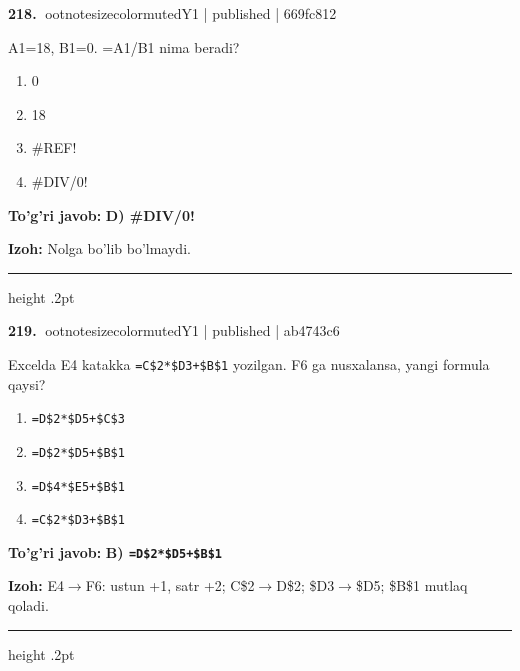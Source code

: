 \documentclass[10pt,a4paper]{article}
\begin{document}
\textbf{\color{ink}218.} {ootnotesizecolor{muted}Y1 | published | 669fc812}
\par
A1=18, B1=0. =A1/B1 nima beradi?
\begin{enumerate}[label=\Alph*),leftmargin=9mm]
\item 0
\item 18
\item \#REF!
\item \#DIV/0!
\end{enumerate}
\begin{tcolorbox}[enhanced,breakable,colback=teal!4,colframe=teal!55!black,boxrule=0.45pt,arc=1.2mm,left=2.8mm,right=2.8mm,top=2mm,bottom=2mm]
\textbf{\color{teal}To'g'ri javob:} \textbf{D) \#DIV/0!}
\par\smallskip
\textbf{Izoh:} Nolga bo'lib bo'lmaydi.
\end{tcolorbox}
\vspace{2mm}\hrule height .2pt\vspace{2mm}

\textbf{\color{ink}219.} {ootnotesizecolor{muted}Y1 | published | ab4743c6}
\par
Excelda E4 katakka \texttt{=C\$2*\$D3+\$B\$1} yozilgan. F6 ga nusxalansa, yangi formula qaysi?
\begin{enumerate}[label=\Alph*),leftmargin=9mm]
\item \texttt{=D\$2*\$D5+\$C\$3}
\item \texttt{=D\$2*\$D5+\$B\$1}
\item \texttt{=D\$4*\$E5+\$B\$1}
\item \texttt{=C\$2*\$D3+\$B\$1}
\end{enumerate}
\begin{tcolorbox}[enhanced,breakable,colback=teal!4,colframe=teal!55!black,boxrule=0.45pt,arc=1.2mm,left=2.8mm,right=2.8mm,top=2mm,bottom=2mm]
\textbf{\color{teal}To'g'ri javob:} \textbf{B) \texttt{=D\$2*\$D5+\$B\$1}}
\par\smallskip
\textbf{Izoh:} E4\ensuremath{\rightarrow}F6: ustun +1, satr +2; C\$2\ensuremath{\rightarrow}D\$2; \$D3\ensuremath{\rightarrow}\$D5; \$B\$1 mutlaq qoladi.
\end{tcolorbox}
\vspace{2mm}\hrule height .2pt\vspace{2mm}
\end{document}
